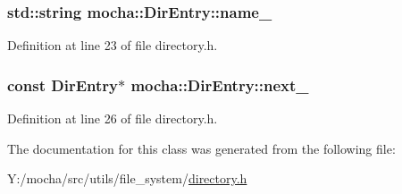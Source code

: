 \hypertarget{classmocha_1_1_dir_entry_a1fffe6a5d6f268f6a00f16e4fbce433d}{
\subsubsection[{name\_\-}]{\setlength{\rightskip}{0pt plus 5cm}std::string {\bf mocha::DirEntry::name\_\-}}}
\label{classmocha_1_1_dir_entry_a1fffe6a5d6f268f6a00f16e4fbce433d}


Definition at line 23 of file directory.h.

\hypertarget{classmocha_1_1_dir_entry_aaedb913694aacd4b88c6ccc5daf78ae8}{
\subsubsection[{next\_\-}]{\setlength{\rightskip}{0pt plus 5cm}const {\bf DirEntry}$\ast$ {\bf mocha::DirEntry::next\_\-}}}
\label{classmocha_1_1_dir_entry_aaedb913694aacd4b88c6ccc5daf78ae8}


Definition at line 26 of file directory.h.



The documentation for this class was generated from the following file:\begin{DoxyCompactItemize}
\item 
Y:/mocha/src/utils/file\_\-system/\hyperlink{directory_8h}{directory.h}\end{DoxyCompactItemize}
